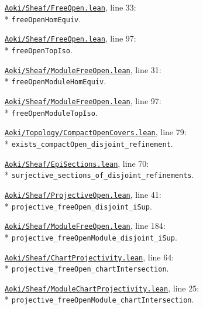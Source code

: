 \begin{leansources}
\item \href{../../../lean/Aoki/Sheaf/FreeOpen.lean}{\nolinkurl{Aoki/Sheaf/FreeOpen.lean}}, line 33:\\*
\nolinkurl{freeOpenHomEquiv}.
\item \href{../../../lean/Aoki/Sheaf/FreeOpen.lean}{\nolinkurl{Aoki/Sheaf/FreeOpen.lean}}, line 97:\\*
\nolinkurl{freeOpenTopIso}.
\item \href{../../../lean/Aoki/Sheaf/ModuleFreeOpen.lean}{\nolinkurl{Aoki/Sheaf/ModuleFreeOpen.lean}}, line 31:\\*
\nolinkurl{freeOpenModuleHomEquiv}.
\item \href{../../../lean/Aoki/Sheaf/ModuleFreeOpen.lean}{\nolinkurl{Aoki/Sheaf/ModuleFreeOpen.lean}}, line 97:\\*
\nolinkurl{freeOpenModuleTopIso}.
\item \href{../../../lean/Aoki/Topology/CompactOpenCovers.lean}{\nolinkurl{Aoki/Topology/CompactOpenCovers.lean}}, line 79:\\*
\nolinkurl{exists_compactOpen_disjoint_refinement}.
\item \href{../../../lean/Aoki/Sheaf/EpiSections.lean}{\nolinkurl{Aoki/Sheaf/EpiSections.lean}}, line 70:\\*
\nolinkurl{surjective_sections_of_disjoint_refinements}.
\item \href{../../../lean/Aoki/Sheaf/ProjectiveOpen.lean}{\nolinkurl{Aoki/Sheaf/ProjectiveOpen.lean}}, line 41:\\*
\nolinkurl{projective_freeOpen_disjoint_iSup}.
\item \href{../../../lean/Aoki/Sheaf/ModuleFreeOpen.lean}{\nolinkurl{Aoki/Sheaf/ModuleFreeOpen.lean}}, line 184:\\*
\nolinkurl{projective_freeOpenModule_disjoint_iSup}.
\item \href{../../../lean/Aoki/Sheaf/ChartProjectivity.lean}{\nolinkurl{Aoki/Sheaf/ChartProjectivity.lean}}, line 64:\\*
\nolinkurl{projective_freeOpen_chartIntersection}.
\item \href{../../../lean/Aoki/Sheaf/ModuleChartProjectivity.lean}{\nolinkurl{Aoki/Sheaf/ModuleChartProjectivity.lean}}, line 25:\\*
\nolinkurl{projective_freeOpenModule_chartIntersection}.
\end{leansources}

